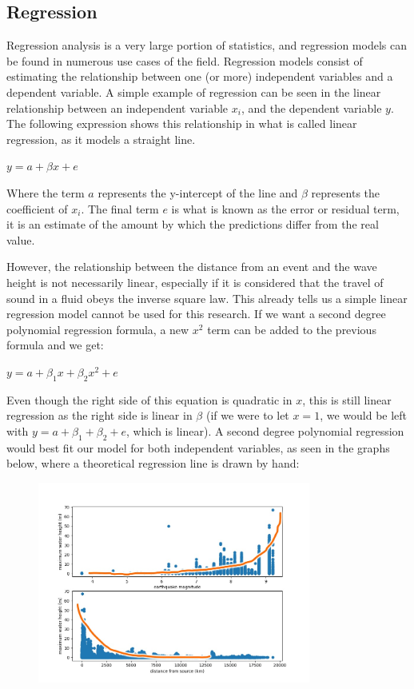 \documentclass[11pt,letterpaper]{article}
\begin{document}
\subsection{Regression}

Regression analysis is a very large portion of statistics, and regression models can
be found in numerous use cases of the field. Regression models consist of estimating the
relationship between one (or more) independent variables and a dependent variable. A
simple example of regression can be seen in the linear relationship between an independent
variable $x_{i}$, and the dependent variable $y$. The following expression shows this relationship in what is
called linear regression, as it models a straight line.

$y = a + \beta x + e $

Where the term $a$ represents the y-intercept of the line and $\beta$ represents the
coefficient of $x_i$. The final term $e$ is what is known as the error or residual
term, it is an estimate of the amount by which the predictions differ from the real
value.

However, the relationship between the distance from an event and the wave height
is not necessarily linear, especially if it is considered that the travel of
sound in a fluid obeys the inverse square law. This already tells us a simple
linear regression model cannot be used for this research. If we want a second degree
polynomial regression formula, a new $x^2$ term can be added to the previous formula
and we get:

$y = a + \beta_1 x + \beta_2 x^2 + e$

Even though the right side of this equation is quadratic in $x$, this is still
linear regression as the right side is linear in $\beta$ (if we were to let
$x = 1$, we would be left with $y = a + \beta_1 + \beta_2 + e$, which is linear).
A second degree polynomial regression would best fit our model for both independent
variables, as seen in the graphs below, where a theoretical regression line is drawn
by hand:

\begin{figure}[h]
    \centering
    \includegraphics[width=0.8\textwidth]{modelshowcase.jpeg}
    \label{fig:boat1}
\end{figure}
\end{document}
